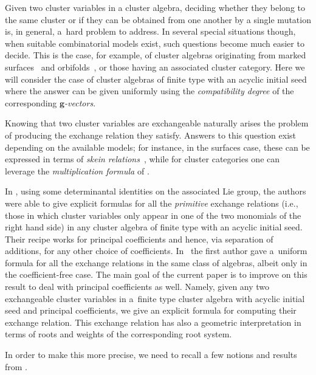 \documentclass[pdftex]{sigma}
\numberwithin{equation}{section}
\newcommand{\bg}{\mathbf{g}}
\begin{document}
  Given two cluster variables in a cluster algebra, deciding whether they belong to the same cluster or if they can be obtained from one another by a single mutation is, in general, a~hard problem to address.
  In several special situations though, when suitable combinatorial models exist, such questions become much easier to decide.
  This is the case, for example, of cluster algebras originating from marked surfaces~\cite{FST08,FT12} and orbifolds~\cite{FST12}, or those having an asso\-ciated cluster category.
  Here we will consider the case of cluster algebras of f\/inite type with an acyclic initial seed where the answer can be given uniformly using the \emph{compatibility degree} of the corresponding \emph{$\bg$-vectors}.

  Knowing that two cluster variables are exchangeable naturally arises the problem of producing the exchange relation they satisfy.
  Answers to this question exist depending on the available models; for instance, in the surfaces case, these can be expressed in terms of \emph{skein relations}~\cite{MW13}, while for cluster categories one can leverage the \emph{multiplication formula} of \cite{CK08}.

  In \cite{YZ08}, using some determinantal identities on the associated Lie group, the authors were able to give explicit formulas for all the \emph{primitive} exchange relations (i.e., those in which cluster variables only appear in one of the two monomials of the right hand side) in any cluster algebra of f\/inite type with an acyclic initial seed.
  Their recipe works for principal coef\/f\/icients and hence, via separation of additions, for any other choice of coef\/f\/icients.
  In~\cite{Ste13} the f\/irst author gave a~uniform formula for all the exchange relations in the same class of algebras, albeit only in the coef\/f\/icient-free case.
  The main goal of the current paper is to improve on this result to deal with principal coef\/f\/icients as well.
  Namely, given any two exchangeable cluster variables in a~f\/inite type cluster algebra with acyclic initial seed and principal coef\/f\/icients, we give an explicit formula for computing their exchange relation.
  This exchange relation has also a geometric interpretation in terms of roots and weights of the corresponding root system.

  In order to make this more precise, we need to recall a few notions and results from \cite{Ste13,YZ08}.
\end{document}
